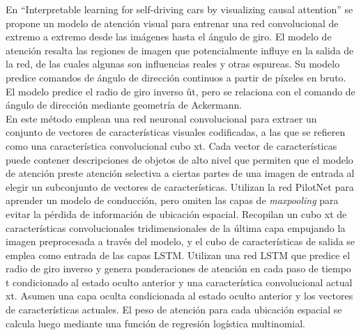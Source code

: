 En ``Interpretable  learning  for  self-driving  cars  by visualizing  causal  attention'' \cite{interpretable} se propone un modelo de atención visual para entrenar una red convolucional de extremo a extremo desde las imágenes hasta el ángulo de giro. El modelo de atención resalta las regiones de imagen que potencialmente influye en la salida de la red, de las cuales algunas son influencias reales y otras espureas. Su modelo predice comandos de ángulo de dirección continuos a partir de píxeles en bruto. El modelo predice el radio de giro inverso ût, pero se relaciona con el comando de ángulo de dirección mediante geometría de Ackermann. \\

En este método emplean una red neuronal convolucional para extraer un conjunto de vectores de características visuales codificadas, a las que se refieren como una característica convolucional cubo xt. Cada vector de características puede contener descripciones de objetos de alto nivel que permiten que el modelo de atención preste atención selectiva a ciertas partes de una imagen de entrada al elegir un subconjunto de vectores de características. Utilizan la red PilotNet \cite{end2end} para aprender un modelo de conducción, pero omiten las capas de \textit{maxpooling} para evitar la pérdida de información de ubicación espacial. Recopilan un cubo xt de características convolucionales tridimensionales de la última capa empujando la imagen preprocesada a través del modelo, y el cubo de características de salida se emplea como entrada de las capas LSTM. Utilizan una red LSTM que predice el radio de giro inverso y genera ponderaciones de atención en cada paso de tiempo t condicionado al estado oculto anterior y una característica convolucional actual xt. Asumen una capa oculta condicionada al estado oculto anterior y los vectores de características actuales. El peso de atención para cada ubicación espacial se calcula luego mediante una función de regresión logística multinomial.\\


